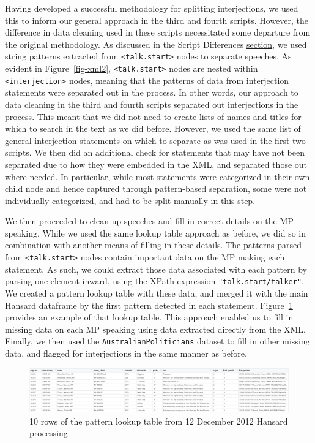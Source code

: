 \documentclass[
  letterpaper,
  DIV=11,
  numbers=noendperiod]{scrartcl}
\begin{document}
Having developed a successful methodology for splitting interjections,
we used this to inform our general approach in the third and fourth
scripts. However, the difference in data cleaning used in these scripts
necessitated some departure from the original methodology. As discussed
in the Script Differences \protect\hyperlink{sec-diff}{section}, we used
string patterns extracted from
\texttt{\textless{}talk.start\textgreater{}} nodes to separate speeches.
As evident in Figure~\ref{fig-xml2},
\texttt{\textless{}talk.start\textgreater{}} nodes are nested within
\texttt{\textless{}interjection\textgreater{}} nodes, meaning that the
patterns of data from interjection statements were separated out in the
process. In other words, our approach to data cleaning in the third and
fourth scripts separated out interjections in the process. This meant
that we did not need to create lists of names and titles for which to
search in the text as we did before. However, we used the same list of
general interjection statements on which to separate as was used in the
first two scripts. We then did an additional check for statements that
may have not been separated due to how they were embedded in the XML,
and separated those out where needed. In particular, while most
statements were categorized in their own child node and hence captured
through pattern-based separation, some were not individually
categorized, and had to be split manually in this step.

We then proceeded to clean up speeches and fill in correct details on
the MP speaking. While we used the same lookup table approach as before,
we did so in combination with another means of filling in these details.
The patterns parsed from \texttt{\textless{}talk.start\textgreater{}}
nodes contain important data on the MP making each statement. As such,
we could extract those data associated with each pattern by parsing one
element inward, using the XPath expression \texttt{"talk.start/talker"}.
We created a pattern lookup table with these data, and merged it with
the main Hansard dataframe by the first pattern detected in each
statement. Figure~\ref{fig-patterns} provides an example of that lookup
table. This approach enabled us to fill in missing data on each MP
speaking using data extracted directly from the XML. Finally, we then
used the \texttt{AustralianPoliticians} dataset to fill in other missing
data, and flagged for interjections in the same manner as before.

\begin{figure}

{\centering \includegraphics{pattern_lookup.jpg}

}

\caption{\label{fig-patterns}10 rows of the pattern lookup table from 12
December 2012 Hansard processing}

\end{figure}
\end{document}
